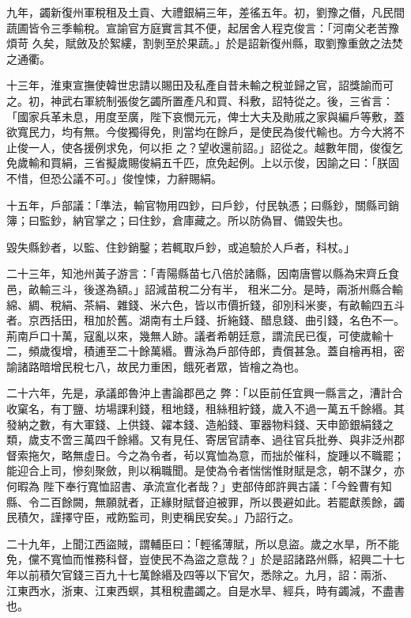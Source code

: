 \begin{pinyinscope}
 九年，蠲新復州軍稅租及土貢、大禮銀絹三年，差徭五年。初，劉豫之僭，凡民間蔬圃皆令三季輸稅。宣諭官方庭實言其不便，起居舍人程克俊言：「河南父老苦豫煩苛
 久矣，賦斂及於絮縷，割剝至於果蔬。」於是詔新復州縣，取劉豫重斂之法焚之通衢。



 十三年，淮東宣撫使韓世忠請以賜田及私產自昔未輸之稅並歸之官，詔獎諭而可之。初，神武右軍統制張俊乞蠲所置產凡和買、科敷，詔特從之。後，三省言：「國家兵革未息，用度至廣，陛下哀憫元元，俾士大夫及勛戚之家與編戶等敷，蓋欲寬民力，均有無。今俊獨得免，則當均在餘戶，是使民為俊代輸也。方今大將不止俊一人，使各援例求免，何以拒
 之？望收還前詔。」詔從之。越數年間，俊復乞免歲輸和買絹，三省擬歲賜俊絹五千匹，庶免起例。上以示俊，因諭之曰：「朕固不惜，但恐公議不可。」俊惶悚，力辭賜絹。



 十五年，戶部議：「準法，輸官物用四鈔，曰戶鈔，付民執憑；曰縣鈔，關縣司銷簿；曰監鈔，納官掌之；曰住鈔，倉庫藏之。所以防偽冒、備毀失也。



 毀失縣鈔者，以監、住鈔銷鑿；若輒取戶鈔，或追驗於人戶者，科杖。」



 二十三年，知池州黃子游言：「青陽縣苗七八倍於諸縣，因南唐嘗以縣為宋齊丘食邑，畝輸三斗，後遂為額。」詔減苗稅二分有半，
 租米二分。是時，兩浙州縣合輸綿、綢、稅絹、茶絹、雜錢、米六色，皆以市價折錢，卻別科米麥，有畝輸四五斗者。京西括田，租加於舊。湖南有土戶錢、折絁錢、醋息錢、曲引錢，名色不一。荊南戶口十萬，寇亂以來，幾無人跡。議者希朝廷意，謂流民已復，可使歲輸十二，頻歲復增，積逋至二十餘萬緡。曹泳為戶部侍郎，責償甚急。蓋自檜再相，密諭諸路暗增民稅七八，故民力重困，餓死者眾，皆檜之為也。



 二十六年，先是，承議郎魯沖上書論郡邑之
 弊：「以臣前任宜興一縣言之，漕計合收窠名，有丁鹽、坊場課利錢，租地錢，租絲租紵錢，歲入不過一萬五千餘緡。其發納之數，有大軍錢、上供錢、糴本錢、造船錢、軍器物料錢、天申節銀絹錢之類，歲支不啻三萬四千餘緡。又有見任、寄居官請奉、過往官兵批券、與非泛州郡督索拖欠，略無虛日。今之為令者，茍以寬恤為意，而拙於催科，旋踵以不職罷；能迎合上司，慘刻聚斂，則以稱職聞。是使為令者惴惴惟財賦是念，朝不謀夕，亦何暇為
 陛下奉行寬恤詔書、承流宣化者哉？」吏部侍郎許興古議：「今銓曹有知縣、令二百餘闕，無願就者，正緣財賦督迫被罪，所以畏避如此。若罷獻羨餘，蠲民積欠，謹擇守臣，戒飭監司，則吏稱民安矣。」乃詔行之。



 二十九年，上聞江西盜賊，謂輔臣曰：「輕徭薄賦，所以息盜。歲之水旱，所不能免，儻不寬恤而惟務科督，豈使民不為盜之意哉？」於是詔諸路州縣，紹興二十七年以前積欠官錢三百九十七萬餘緡及四等以下官欠，悉除之。九月，詔：兩浙、
 江東西水，浙東、江東西螟，其租稅盡蠲之。自是水旱、經兵，時有蠲減，不盡書也。




\end{pinyinscope}
